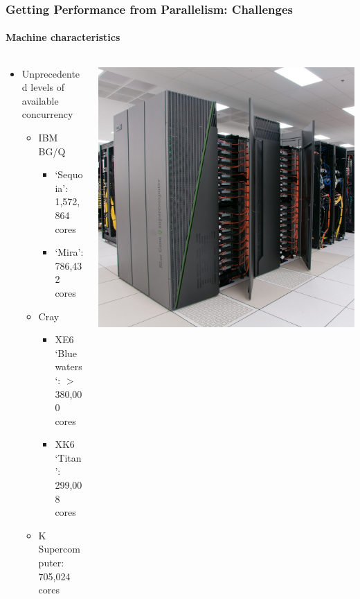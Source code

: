 \begin{frame}[fragile]
  \frametitle{Getting Performance from Parallelism: Challenges}
  \framesubtitle{Machine characteristics}
  \begin{columns}
    \begin{column}{0.55\textwidth}
      \begin{itemize}
      \item Unprecedented levels of available concurrency
        \begin{itemize}
        \item IBM BG/Q
          \begin{itemize}
          \item `Sequoia': 1,572,864 cores
          \item `Mira': 786,432 cores
          \end{itemize}
        \item Cray
          \begin{itemize}
          \item XE6 `Bluewaters`: $>$ 380,000 cores
          \item XK6 `Titan': 299,008 cores
          \end{itemize}
        \item K Supercomputer: 705,024 cores
        \end{itemize}
      \end{itemize}
    \end{column}
    \begin{column}{0.45\textwidth}
      \includegraphics[width=1\textwidth]{figures/mira.jpg}
    \end{column}
  \end{columns}
\end{frame}


